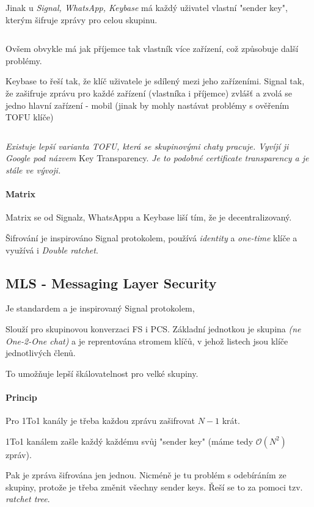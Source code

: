 \documentclass[10pt,a4paper]{article}
\begin{document}
Jinak u \textit{Signal, WhatsApp, Keybase} má každý uživatel vlastní "sender key", kterým šifruje zprávy pro celou skupinu.

$ $

Ovšem obvykle má jak příjemce tak vlastník více zařízení, což způsobuje další problémy.

Keybase to řeší tak, že klíč uživatele je sdílený mezi jeho zařízeními.
Signal tak, že zašifruje zprávu pro každé zařízení (vlastníka i příjemce) zvlášť a zvolá se jedno hlavní zařízení - mobil (jinak by mohly nastávat problémy s ověřením TOFU klíče)

$ $

\textit{Existuje lepší varianta TOFU, která se skupinovými chaty pracuje. Vyvíjí ji Google pod názvem} Key Transparency. 
\textit{Je to podobné certificate transparency a je stále ve vývoji.}


\paragraph{Matrix}

Matrix se od Signalz, WhatsAppu a Keybase liší tím, že je decentralizovaný.

Šifrování je inspirováno Signal protokolem, používá \textit{identity} a \textit{one-time} klíče a využívá i \textit{Double ratchet}.


\subsection{MLS - Messaging Layer Security}
Je standardem a je inspirovaný Signal protokolem,

Slouží pro skupinovou konverzaci FS i PCS. 
Základní jednotkou je skupina \textit{(ne One-2-One chat)} a je reprentována stromem klíčů, v jehož listech jsou klíče jednotlivých členů.

To umožňuje lepší škálovatelnost pro velké skupiny.

\paragraph{Princip}

Pro 1To1 kanály je třeba každou zprávu zašifrovat $ N-1 $ krát.

1To1 kanálem zašle každý každému svůj "sender key" (máme tedy $\mathcal O(N^2)$ zpráv).

Pak je zpráva šifrována jen jednou. Nicméně je tu problém s odebíráním ze skupiny, protože je třeba změnit
všechny sender keys.
Řeší se to za pomoci tzv. \textit{ratchet tree}.
\end{document}
